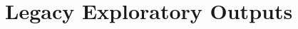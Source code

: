\documentclass[12pt, a4paper]{article}
\begin{document}
\section{Legacy Exploratory Outputs}
\label{sec:comparison}




\end{document}
